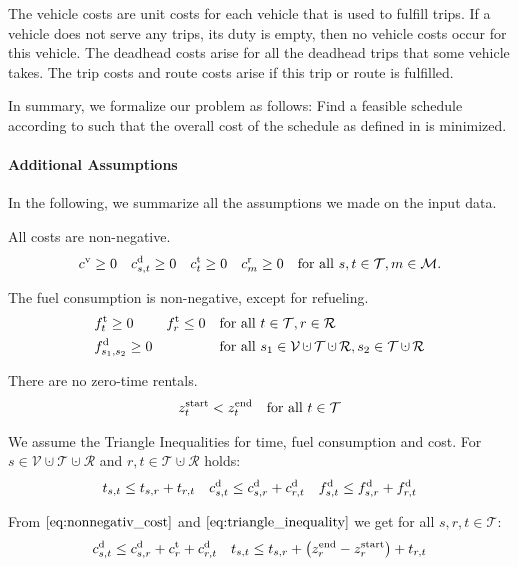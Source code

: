 The vehicle costs are unit costs for each vehicle that is used to fulfill trips. If a vehicle does not serve any trips, \ie its duty is empty, then no vehicle costs occur for this vehicle. The deadhead costs arise for all the deadhead trips that some vehicle takes. The trip costs and route costs arise if this trip or route is fulfilled.

In summary, we formalize our problem as follows: Find a feasible schedule according to  such that the overall cost of the schedule as defined in  is minimized.

\paragraph{Additional Assumptions} \parfill

In the following, we summarize all the assumptions we made on the input data.

All costs are non-negative.
\begin{align}
\label{eq:nonnegativ_cost}
	c^{\operatorname{v}}\geq 0 && c^{\operatorname{d}}_{s,t}\geq 0 && c^{\operatorname{t}}_t\geq 0 && c^{\operatorname{r}}_m\geq 0 && \text{for all } s,t\in\mathcal{T}, m\in\mathcal{M}.
\end{align}

The fuel consumption is non-negative, except for refueling.
\begin{align}
	& \ft_t\geq 0 && \ft_r\leq 0 && \text{for all } t\in\mathcal{T}, r\in\mathcal{R} \\
	& \fd_{s_1,s_2} \geq 0 &&&& \text{for all } s_1\in\mathcal{V}\cupdot\mathcal{T}\cupdot\mathcal{R},s_2\in\mathcal{T}\cupdot\mathcal{R}
\end{align}

There are no zero-time rentals.
\begin{align}
\label{eq:notime_trip}
	z^{\operatorname{start}}_t < z^{\operatorname{end}}_t && \text{for all } t\in\mathcal{T}
\end{align}

We assume the Triangle Inequalities for time, fuel consumption and cost. For $s\in\mathcal{V}\cupdot\mathcal{T}\cupdot\mathcal{R}$ and $r,t\in\mathcal{T}\cupdot\mathcal{R}$ holds:
\begin{align}
\label{eq:triangle_inequality}
	t_{s,t} \leq t_{s,r} + t_{r,t} && c^{\operatorname{d}}_{s,t} \leq c^{\operatorname{d}}_{s,r} + c^{\operatorname{d}}_{r,t} && f^{\operatorname{d}}_{s,t} \leq f^{\operatorname{d}}_{s,r} + f^{\operatorname{d}}_{r,t}
\end{align}

From $\eqref{eq:nonnegativ_cost}$ and $\eqref{eq:triangle_inequality}$ we get for all $s,r,t\in\mathcal{T}$:
\begin{align}
	c^{\operatorname{d}}_{s,t} \leq c^{\operatorname{d}}_{s,r} + c^{\operatorname{t}}_{r} + c^{\operatorname{d}}_{r,t} && t_{s,t}\leq t_{s,r} + \left(z^{\operatorname{end}}_r - z^{\operatorname{start}}_r\right) + t_{r,t} \label{eq:triangle_inequality_ext}
\end{align}


